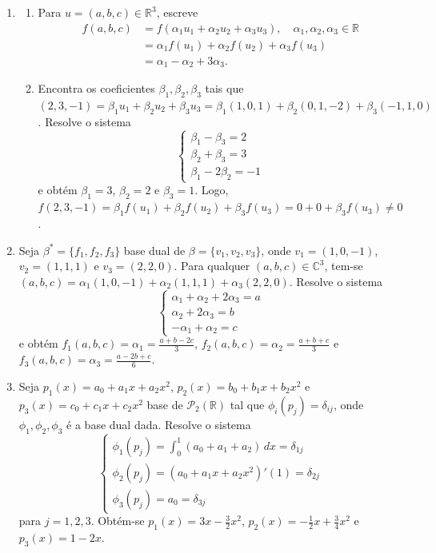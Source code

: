 \documentclass{article}
\begin{document}
\begin{enumerate}
    \item [\textbf{E5}] 
        \begin{enumerate}
            \item [(a)] Para \(u=(a,b,c) \in \mathbb{R}^3\), escreve \begin{align}
                f(a,b,c) &= f(\alpha_1 u_1 + \alpha_2 u_2 + \alpha_3 u_3), \quad \alpha_1, \alpha_2, \alpha_3 \in \mathbb{R} \\
                &= \alpha_1 f(u_1) + \alpha_2 f(u_2) + \alpha_3 f(u_3) \\
                &= \alpha_1 - \alpha_2 + 3\alpha_3.
            \end{align}
            \item [(b)] Encontra os coeficientes \(\beta_1, \beta_2, \beta_3\) tais que \((2,3,-1) = \beta_1 u_1 + \beta_2 u_2 + \beta_3 u_3 = \beta_1 (1,0,1) + \beta_2 (0,1,-2) + \beta_3 (-1,1,0)\). Resolve o sistema
            \[\begin{cases}
                \beta_1 - \beta_3 = 2 \\
                \beta_2 + \beta_3 = 3 \\
                \beta_1 - 2\beta_2 = -1
            \end{cases}\]
            e obtém \(\beta_1 = 3\), \(\beta_2 = 2\) e \(\beta_3 = 1\). Logo, \(f(2,3,-1) = \beta_1 f(u_1) + \beta_2 f(u_2) + \beta_3 f(u_3) = 0 + 0 + \beta_3 f(u_3) \neq 0\).
        \end{enumerate}
    \item [\textbf{E6}] Seja \(\beta^* = \{f_1, f_2, f_3\}\) base dual de \(\beta = \{v_1, v_2, v_3\}\), onde \(v_1 = (1,0,-1)\), \(v_2 = (1,1,1)\) e \(v_3 = (2,2,0)\). Para qualquer \((a,b,c) \in \mathbb{C}^3\), tem-se \((a,b,c) = \alpha_1 (1,0,-1) + \alpha_2 (1,1,1) + \alpha_3 (2,2,0)\). Resolve o sistema
        \[\begin{cases}
            \alpha_1 + \alpha_2 + 2\alpha_3 = a \\
            \alpha_2 + 2\alpha_3 = b \\
            -\alpha_1 + \alpha_2 = c
        \end{cases}\]
        e obtém \(f_1(a,b,c) = \alpha_1 = \frac{a+b-2c}{3}\), \(f_2(a,b,c) = \alpha_2 = \frac{a+b+c}{3}\) e \(f_3(a,b,c) = \alpha_3 = \frac{a-2b+c}{6}\).
    \item [\textbf{E7}] Seja \(p_1(x) = a_0 + a_1 x + a_2 x^2\), \(p_2(x) = b_0 + b_1 x + b_2 x^2\) e \(p_3(x) = c_0 + c_1 x + c_2 x^2\) base de \(\mathcal{P}_2(\mathbb{R})\) tal que \(\phi_i(p_j) = \delta_{ij}\), onde \(\phi_1, \phi_2, \phi_3\) é a base dual dada. Resolve o sistema
        \[\begin{cases}
            \phi_1(p_j) = \int_{0}^{1} (a_0 + a_1 + a_2)\, dx = \delta_{1j} \\
            \phi_2(p_j) = (a_0 + a_1 x + a_2 x^2)'(1) = \delta_{2j} \\
            \phi_3(p_j) = a_0 = \delta_{3j}
        \end{cases}\]
        para \(j = 1, 2, 3\). Obtém-se \(p_1(x) = 3x - \frac{3}{2} x^2\), \(p_2(x) = -\frac{1}{2}x + \frac{3}{4}x^2\) e \(p_3(x) = 1 - 2x\).
\end{enumerate}
\end{document}
